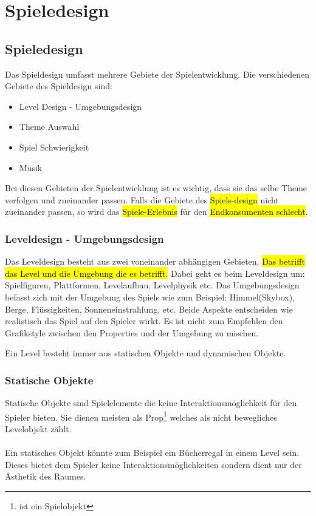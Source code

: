 \pagebreak
{}
\chapter{Spieledesign} %
\section{Spieledesign} %

Das Spieldesign umfasst mehrere Gebiete der Spielentwicklung. Die verschiedenen Gebiete des Spieldesign sind:

\begin{itemize} %
    \item Level Design - Umgebungsdesign 
    \item Theme Auswahl 
    \item Spiel Schwierigkeit 
    \item Musik
\end{itemize}

Bei diesen Gebieten der Spielentwicklung ist es wichtig, dass sie das selbe Theme verfolgen und zueinander passen. Falls die Gebiete des \hl{Spiels-design} nicht zueinander passen, so wird das \hl{Spiele-Erlebnis} für den \hl{Endkonsumenten schlecht}. 

\subsection{Leveldesign - Umgebungsdesign}
Das Leveldesign besteht aus zwei voneinander abhängigen Gebieten. \hl{Das betrifft das Level und die Umgebung die es betrifft.} Dabei geht es beim Leveldesign um: Spielfiguren, Plattformen, Levelaufbau, Levelphysik etc. 
Das Umgebungsdesign befasst sich mit der Umgebung des Spiels wie zum Beispiel: Himmel(Skybox), Berge, Flüssigkeiten, Sonneneinstrahlung, etc. 
Beide Aspekte entscheiden wie realistisch das Spiel auf den Spieler wirkt. Es ist nicht zum Empfehlen den Grafikstyle zwischen den Properties und der Umgebung zu mischen.

Ein Level besteht immer aus statischen Objekte und dynamischen Objekte. %

\pagebreak

\subsection{Statische Objekte} %
Statische Objekte sind Spielelemente die keine Interaktionsmöglichkeit für den Spieler bieten. Sie dienen meisten als Prop\footnote[1]{ist ein Spielobjekt} welches als nicht bewegliches Levelobjekt zählt. \\\\
Ein statisches Objekt könnte zum Beispiel ein Bücherregal in einem Level sein. Dieses bietet dem Spieler keine Interaktionsmöglichkeiten sondern dient nur der Ästhetik des Raumes. \\


